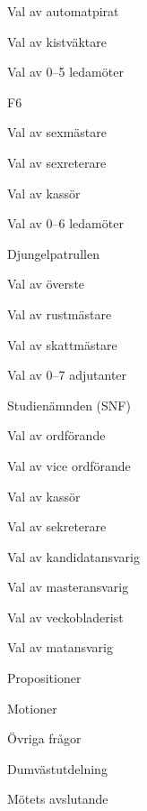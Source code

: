 \documentclass[prelim]{sektionsmote}
\begin{document}
\begin{ootd}
\begin{ootd}
\begin{ootd}
        \item Val av automatpirat
        \item Val av kistväktare
        \item Val av 0--5 ledamöter
    \end{ootd}
    \item F6
    \begin{ootd}
        \item Val av sexmästare
        \item Val av sexreterare
        \item Val av kassör
        \item Val av 0--6 ledamöter
    \end{ootd}
    \item Djungelpatrullen
    \begin{ootd}
        \item Val av överste
        \item Val av rustmästare
        \item Val av skattmästare
        \item Val av 0--7 adjutanter
    \end{ootd}
    \item Studienämnden (SNF)
    \begin{ootd}
        \item Val av ordförande
        \item Val av vice ordförande
        \item Val av kassör
        \item Val av sekreterare
        \item Val av kandidatansvarig
        \item Val av masteransvarig
        \item Val av veckobladerist
        \item Val av matansvarig
    \end{ootd}
\end{ootd}

\item{Propositioner}

\item{Motioner}

\item{Övriga frågor}

\item{Dumvästutdelning}

\item{Mötets avslutande}
\end{ootd}
\end{document}
